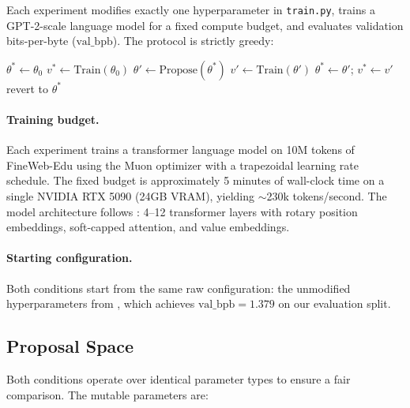 \documentclass[11pt]{article}
\newcommand{\val}{\text{val\_bpb}}
\begin{document}
Each experiment modifies exactly one hyperparameter in \texttt{train.py},
trains a GPT-2-scale language model for a fixed compute budget, and
evaluates validation bits-per-byte ($\val$). The protocol is strictly
greedy:

\begin{algorithm}
\caption{Greedy Keep/Discard Loop}
\begin{algorithmic}[1]
\STATE $\theta^* \gets \theta_0$ 
\STATE $v^* \gets \text{Train}(\theta_0)$ \COMMENT{starting $\val$}
  \STATE $\theta' \gets \text{Propose}(\theta^*)$ 
  \STATE $v' \gets \text{Train}(\theta')$
    \STATE $\theta^* \gets \theta'$; $v^* \gets v'$ 
  \ELSE
    \STATE revert to $\theta^*$ 
  \ENDIF
\ENDWHILE
\end{algorithmic}
\end{algorithm}

\paragraph{Training budget.}
Each experiment trains a transformer language model on 10M tokens of
FineWeb-Edu \citep{penedo2024fineweb} using the Muon optimizer
\citep{jordan2024muon} with a trapezoidal learning rate schedule. The
fixed budget is approximately 5 minutes of wall-clock time on a single
NVIDIA RTX 5090 (24GB VRAM), yielding $\sim$230k tokens/second. The
model architecture follows \citet{karpathy2024modded}: 4--12 transformer
layers with rotary position embeddings, soft-capped attention, and
value embeddings.

\paragraph{Starting configuration.}
Both conditions start from the same raw configuration: the unmodified
hyperparameters from \citet{karpathy2024modded}, which achieves
$\val = 1.379$ on our evaluation split.

\subsection{Proposal Space}
\label{sec:proposal-space}

Both conditions operate over identical parameter types to ensure a fair
comparison. The mutable parameters are:
\end{document}
